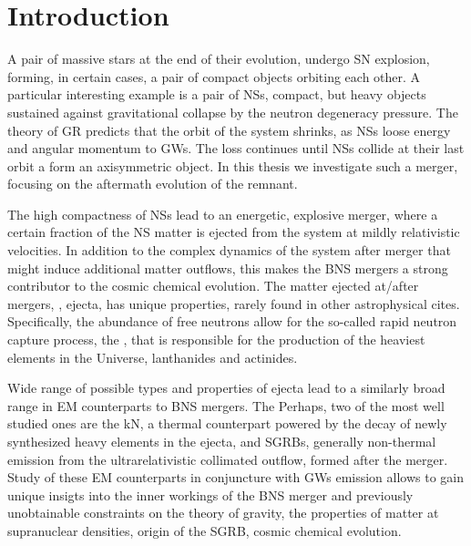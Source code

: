 
\chapter{Introduction} %

\label{ch:intro} %



A pair of massive stars at the end of their evolution, undergo \ac{SN} explosion, forming, 
in certain cases, a pair of compact objects orbiting each other. A particular interesting 
example is a pair of \acp{NS}, compact, but heavy objects sustained against gravitational 
collapse by the neutron degeneracy pressure. The theory of \ac{GR} predicts that the orbit 
of the system shrinks, as \acp{NS} loose energy and angular momentum to \acp{GW}. The 
loss continues until \acp{NS} collide at their last orbit a form an axisymmetric object.
In this thesis we investigate such a merger, focusing on the aftermath evolution of the 
remnant. 

The high compactness of \acp{NS} lead to an energetic, explosive merger, where a certain
fraction of the \ac{NS} matter is ejected from the system at mildly relativistic 
velocities. In addition to the complex dynamics of the system after merger that might 
induce additional matter outflows, this makes the \ac{BNS} mergers a strong contributor 
to the cosmic chemical evolution. The matter ejected at/after mergers, \ie, ejecta, has 
unique properties, rarely found in other astrophysical cites. Specifically, the abundance 
of free neutrons allow for the so-called rapid neutron capture process,
the \rproc{}, that is responsible for the production of the heaviest elements in the 
Universe, lanthanides and actinides. 

Wide range of possible types and properties of ejecta lead to a similarly broad 
range in \ac{EM} counterparts to \ac{BNS} mergers. The Perhaps, two of the most 
well studied ones are the \ac{kN}, a thermal counterpart powered by the decay of 
newly synthesized heavy elements in the ejecta, and \acp{SGRB}, generally non-thermal 
emission from the ultrarelativistic collimated outflow, formed after the merger. 
Study of these \ac{EM} counterparts in conjuncture with \acp{GW} emission allows to 
gain unique insigts into the inner workings of the \ac{BNS} merger and previously 
unobtainable constraints on the theory of gravity, the properties of matter at 
supranuclear densities, origin of the \ac{SGRB}, cosmic chemical evolution. 

